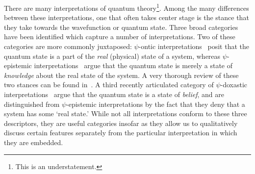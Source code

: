\documentclass[%
 reprint,
superscriptaddress,
nofootinbib,
 amsmath,amssymb,
 prx, 
 accepted=2019-09-27,
]{quantumarticle}
\begin{document}
There are many interpretations of quantum theory\footnote{This is an
  understatement.}. Among the many differences between these
interpretations, one that often takes center stage is the stance that
they take towards the wavefunction or quantum state.  Three broad
categories have been identified which capture a number of
interpretations.  Two of these categories are more commonly
juxtaposed: $\psi$-ontic
interpretations~\cite{BohmSuggestedInterpretationQuantum1952,EverettRelativeStateFormulation1957,DiracPrinciplesQuantumMechanics1958,GhirardiUnifieddynamicsmicroscopic1986,PearleCombiningstochasticdynamical1989,Valentinipilotwavetheoryclassical1991,
  BohmUndividedUniverse1993,HollandQuantumTheoryMotion1993,Beltrametticlassicalextensionquantum1995,DieksModalInterpretationQuantum1998,PearleCollapsemodels1999,BarrettQuantumMechanicsMinds1999,LombardiModalInterpretationsQuantum,BassiModelswavefunctioncollapse2013}
posit that the quantum state is a part of the \emph{real} (physical)
state of a system, whereas $\psi$-epistemic
interpretations~\cite{EinsteinCanQuantumMechanicalDescription1935,KochenProblemHiddenVariables1967,BallentineStatisticalInterpretationQuantum1970,HowardEinsteinlocalityseparability1985,BallentineInadequacyEhrenfesttheorem1994,EmersonQuantumChaosQuantumClassical2002,RudolphOntologicalModelsQuantum2006,Spekkensdefenseepistemicview2007,HarriganEinsteinincompletenessepistemic2010}
argue that the quantum state is merely a state of \emph{knowledge}
about the real state of the system. A very thorough review of these
two stances can be found in~\cite{Leiferquantumstatereal2014}. A third
recently articulated category of $\psi$-doxastic
interpretations~\cite{CabelloInterpretationsquantumtheory2017,SchackParticipatoryrealism2016,WernerHeisenbergPhysicsPhilosophy1958,FuchsintroductionQBismapplication2014,RovelliRelationalquantummechanics1996,HealeyQuantumTheoryPragmatist2010,BubWhyBohrwas2017}
argue that the quantum state is a state of \emph{belief}, and are
distinguished from $\psi$-epistemic interpretations by the fact that
they deny that a system has some `real state.' While not all
interpretations conform to these three descriptors, they are useful
categories insofar as they allow us to qualitatively discuss certain
features separately from the particular interpretation in which they
are embedded.
\end{document}

